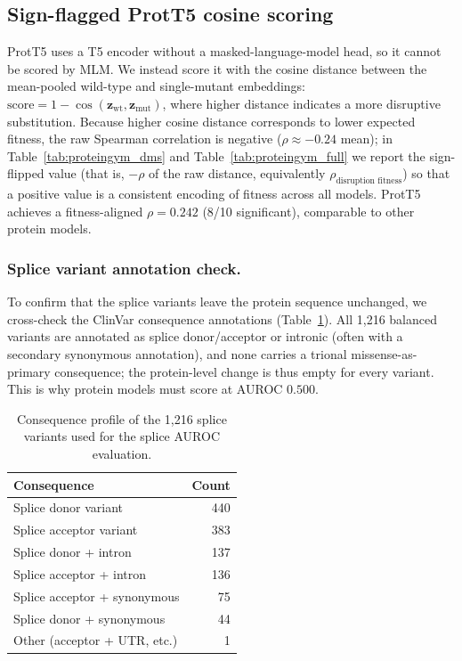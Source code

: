 \documentclass[9pt]{article}
\begin{document}
\subsection{Sign-flagged ProtT5 cosine scoring}

ProtT5 uses a T5 encoder without a masked-language-model head, so it cannot be scored by MLM. We instead score it with the cosine distance between the mean-pooled wild-type and single-mutant embeddings: $\text{score} = 1 - \cos(\mathbf{z}_{\text{wt}}, \mathbf{z}_{\text{mut}})$, where higher distance indicates a more disruptive substitution. Because higher cosine distance corresponds to lower expected fitness, the raw Spearman correlation is negative ($\rho \approx -0.24$ mean); in Table~\ref{tab:proteingym_dms} and Table~\ref{tab:proteingym_full} we report the sign-flipped value (that is, $-\rho$ of the raw distance, equivalently $\rho_{\text{disruption fitness}}$) so that a positive value is a consistent encoding of fitness across all models. ProtT5 achieves a fitness-aligned $\rho = 0.242$ (8/10 significant), comparable to other protein models.

\subsubsection{Splice variant annotation check.}
To confirm that the splice variants leave the protein sequence unchanged, we cross-check the ClinVar consequence annotations (Table~\ref{tab:splice_consequences}). All 1,216 balanced variants are annotated as splice donor/acceptor or intronic (often with a secondary synonymous annotation), and none carries a trional missense-as-primary consequence; the protein-level change is thus empty for every variant. This is why protein models must score at AUROC $0.500$.

\begin{table}[h]
\centering
\caption{Consequence profile of the 1,216 splice variants used for the splice AUROC evaluation.}
\label{tab:splice_consequences}
\small
\begin{tabular}{lr}
\toprule
\textbf{Consequence} & \textbf{Count} \\
\midrule
Splice donor variant & 440 \\
Splice acceptor variant & 383 \\
Splice donor + intron & 137 \\
Splice acceptor + intron & 136 \\
Splice acceptor + synonymous & 75 \\
Splice donor + synonymous & 44 \\
Other (acceptor + UTR, etc.) & 1 \\
\bottomrule
\end{tabular}
\end{table}
\end{document}
